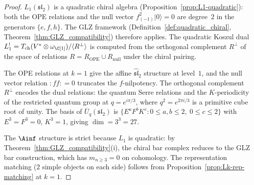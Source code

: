 \begin{proof}
$L_1(\mathfrak{sl}_2)$ is a quadratic chiral algebra
(Proposition~\ref{prop:L1-quadratic}): both the OPE
relations and the null vector
$f_{(-1)}^2|0\rangle = 0$ are degree~$2$ in the
generators $\{e, f, h\}$. The GLZ framework
(Definition~\ref{def:quadratic_chiral},
Theorem~\ref{thm:GLZ_compatibility}) therefore applies.
The quadratic Koszul dual
$L_1^! = T_{\mathrm{ch}}(V^* \otimes \omega_\C[1])
/ \langle R^\perp \rangle$
is computed from the orthogonal complement $R^\perp$ of
the space of relations
$R = R_{\mathrm{OPE}} \cup R_{\mathrm{null}}$ under
the chiral pairing.

The OPE relations at $k = 1$ give the affine
$\widehat{\mathfrak{sl}}_2$ structure at level~$1$,
and the null vector relation $:ff: = 0$ truncates the
$f$-nilpotency. The orthogonal complement $R^\perp$
encodes the dual relations: the quantum Serre relations
and the $K$-periodicity of the restricted quantum group
at $q = e^{i\pi/3}$, where
$q^2 = e^{2\pi i/3}$ is a primitive cube root of unity.
The basis of $\overline{U}_q(\mathfrak{sl}_2)$ is
$\{E^a F^b K^c : 0 \le a, b \le 2,\; 0 \le c \le 2\}$
with $E^3 = F^3 = 0$, $K^3 = 1$, giving
$\dim = 3^3 = 27$.

The $\Ainf$ structure is strict because $L_1$ is
quadratic: by Theorem~\ref{thm:GLZ_compatibility}(i),
the chiral bar complex reduces to the GLZ bar
construction, which has $m_{n \ge 3} = 0$ on
cohomology. The representation matching
($2$ simple objects on each side) follows from
Proposition~\ref{prop:Lk-rep-matching} at $k = 1$.
\end{proof}

